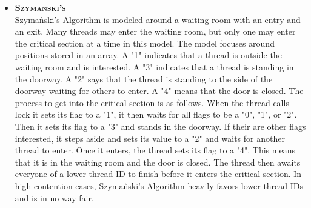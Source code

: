 \documentclass[FinalReport.tex]{subfiles}
\begin{document}
\begin{itemize}
		\item \textsc{ \bf Szyma\`{n}ski's}\\
		Szyma\`{n}ski's Algorithm is modeled around a waiting room with an entry and an exit. Many threads may enter the waiting room, but only one may enter the critical section at a time in this model. The model focuses around positions stored in an array. A "1" indicates that a thread is outside the waiting room and is interested. A "3" indicates that a thread is standing in the doorway. A "2" says that the thread is standing to the side of the doorway waiting for others to enter. A "4" means that the door is closed. The process to get into the critical section is as follows. When the thread calls lock it sets its flag to a "1", it then waits for all flags to be a "0", "1", or "2". Then it sets its flag to a "3" and stands in the doorway. If their are other flags interested, it steps aside and sets its value to a "2" and waits for another thread to enter. Once it enters, the thread sets its flag to a "4". This means that it is in the waiting room and the door is closed. The thread then awaits everyone of a lower thread ID to finish before it enters the critical section. In high contention cases, Szyma\`{n}ski's Algorithm heavily favors lower thread IDs and is in no way fair.
		
	\end{itemize}
	
	
	
	
\end{document}
